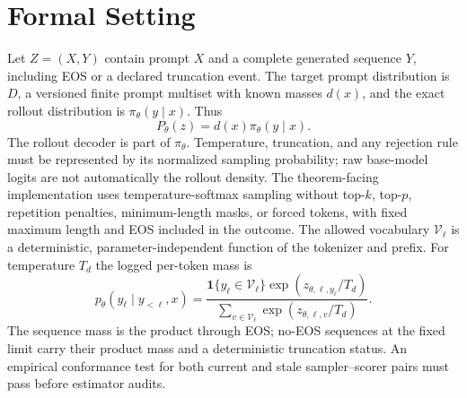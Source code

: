 \documentclass{article}
\begin{document}
\section{Formal Setting}
\label{sec:setting}

Let $Z=(X,Y)$ contain prompt $X$ and a complete generated sequence $Y$,
including EOS or a declared truncation event. The target prompt distribution is
$D$, a versioned finite prompt multiset with known masses $d(x)$, and the exact rollout distribution is
$\pi_\theta(y\mid x)$. Thus
\begin{equation}
P_\theta(z)=d(x)\pi_\theta(y\mid x).
\label{eq:target-law}
\end{equation}
The rollout decoder is part of $\pi_\theta$. Temperature, truncation, and any
rejection rule must be represented by its normalized sampling probability;
raw base-model logits are not automatically the rollout density. The
theorem-facing implementation uses temperature-softmax sampling without
top-$k$, top-$p$, repetition penalties, minimum-length masks, or forced tokens,
with fixed maximum length and EOS included in the outcome.
The allowed vocabulary $\mathcal V_\ell$ is a deterministic,
parameter-independent function of the tokenizer and prefix. For temperature
$T_d$ the logged
per-token mass is
\begin{equation}
p_\theta(y_\ell\mid y_{<\ell},x)=
\frac{\mathbf 1\{y_\ell\in\mathcal V_\ell\}
\exp(z_{\theta,\ell,y_\ell}/T_d)}
{\sum_{v\in\mathcal V_\ell}\exp(z_{\theta,\ell,v}/T_d)}.
\label{eq:decoder-pmf}
\end{equation}
The sequence mass is the product through EOS; no-EOS sequences at the fixed
limit carry their product mass and a deterministic truncation status. An
empirical conformance test for both current and stale sampler--scorer pairs
must pass before estimator audits.
\end{document}
